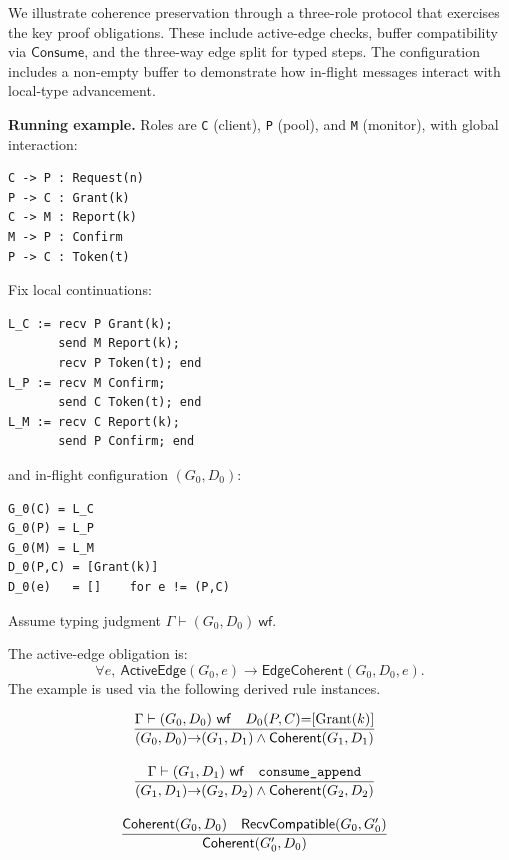 \documentclass[a4paper,10pt,twocolumn,english]{article}
\numberwithin{equation}{section}
\theoremstyle{paperdef}
\theoremstyle{paperplain}
\theoremstyle{paperdef}
\theoremstyle{paperremark}
\newcommand{\Coherent}{\ensuremath{\mathsf{Coherent}}}
\newcommand{\EdgeCoherent}{\ensuremath{\mathsf{EdgeCoherent}}}
\newcommand{\ActiveEdge}{\ensuremath{\mathsf{ActiveEdge}}}
\newcommand{\Consume}{\ensuremath{\mathsf{Consume}}}
\newcommand{\wf}{\ensuremath{\mathsf{wf}}}
\newcommand{\RecvCompatible}{\ensuremath{\mathsf{RecvCompatible}}}
\begin{document}
We illustrate coherence preservation through a three-role protocol that exercises the key proof obligations. These include active-edge checks, buffer compatibility via \Consume, and the three-way edge split for typed steps. The configuration includes a non-empty buffer to demonstrate how in-flight messages interact with local-type advancement.

\noindent\begingroup\raggedright
\textbf{Running example.} Roles are \texttt{C} (client), \texttt{P} (pool), and \texttt{M} (monitor), with global interaction:
\par\endgroup

\noindent\begin{minipage}{\columnwidth}
	\begin{lstlisting}
C -> P : Request(n)
P -> C : Grant(k)
C -> M : Report(k)
M -> P : Confirm
P -> C : Token(t)
\end{lstlisting}
\end{minipage}

Fix local continuations:

\noindent\begin{minipage}{\columnwidth}
	\begin{lstlisting}
L_C := recv P Grant(k);
       send M Report(k);
       recv P Token(t); end
L_P := recv M Confirm;
       send C Token(t); end
L_M := recv C Report(k);
       send P Confirm; end
\end{lstlisting}
\end{minipage}

and in-flight configuration $(G_0,D_0)$:

\noindent\begin{minipage}{\columnwidth}
	\begin{lstlisting}
G_0(C) = L_C
G_0(P) = L_P
G_0(M) = L_M
D_0(P,C) = [Grant(k)]
D_0(e)   = []    for e != (P,C)
\end{lstlisting}
\end{minipage}

Assume typing judgment $\Gamma \vdash (G_0,D_0)\ \wf$.

The active-edge obligation is:
\begin{equation}
	\forall e,\ \ActiveEdge(G_0,e)\to \EdgeCoherent(G_0,D_0,e).
\end{equation}
The example is used via the following derived rule instances.

	{\footnotesize
		\begin{gather}
			\dfrac{
				\Gamma \vdash (G_0,D_0)\ \wf \quad D_0(P,C){=}[\mathrm{Grant}(k)]
			}{
				(G_0,D_0){\to}(G_1,D_1) \land \Coherent(G_1,D_1)
			}\hspace{0.75em}
			\\[10pt]
			\dfrac{
				\Gamma \vdash (G_1,D_1)\ \wf \quad \text{\texttt{consume\_append}}
			}{
				(G_1,D_1){\to}(G_2,D_2) \land \Coherent(G_2,D_2)
			}\hspace{0.75em}
			\\[10pt]
			\dfrac{
				\Coherent(G_0,D_0) \quad \RecvCompatible(G_0,G'_0)
			}{
				\Coherent(G'_0,D_0)
			}\hspace{0.75em}
		\end{gather}
		\vspace{6pt}
	}
\end{document}
